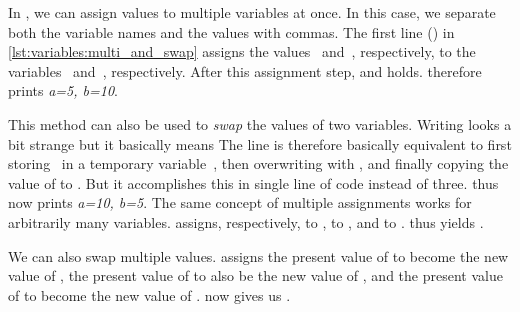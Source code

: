 %
%
%
%
In \python, we can assign values to multiple variables at once.
In this case, we separate both the variable names and the values with commas.
The first line (\pythonIdx{,}) in \cref{lst:variables:multi_and_swap} assigns the values~ and~, respectively, to the variables~ and~, respectively.
After this assignment step,  and  holds.
 therefore prints \textit{a=5, b=10}.

This method can also be used to \emph{swap} the values of two variables.
Writing  looks a bit strange but it basically means 
The line is therefore basically equivalent to first storing~ in a temporary variable~, then overwriting  with , and finally copying the value of  to .
But it accomplishes this in single line of code instead of three.
 thus now prints \textit{a=10, b=5}.%
%
%
%
The same concept of multiple assignments works for arbitrarily many variables.
 assigns, respectively,  to ,  to , and  to .
 thus yields .

We can also swap multiple values.
 assigns the present value of  to become the new value of , the present value of  to also be the new value of , and the present value of  to become the new value of .
 now gives us .
%
\endhsection%
%
